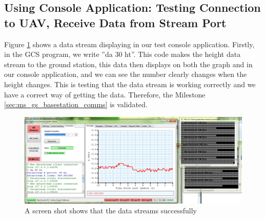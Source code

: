 \subsection{Using Console Application: Testing Connection to UAV, Receive Data from Stream Port}
\label{sec:testing_receive_stream}
Figure \ref{test screenshot} shows a data stream displaying in our test console application.
Firstly, in the GCS program, we write ''da 30 ht''. 
This code makes the height data stream to the ground station, this data then displays on both the graph and in our console application, and we can see the number clearly changes when the height changes.
This is testing that the data stream is working correctly and we have a correct way of getting the data.
Therefore, the Milestone \ref{sec:ms_gs_basestation_comms} is validated.
\begin{figure}[H]
\begin{center}
\includegraphics[width=1.00\textwidth]{testing_screenshots/test_data.png} 
\end{center}
\caption{A screen shot shows that the data streams successfully\label{test screenshot}}
\end{figure}

